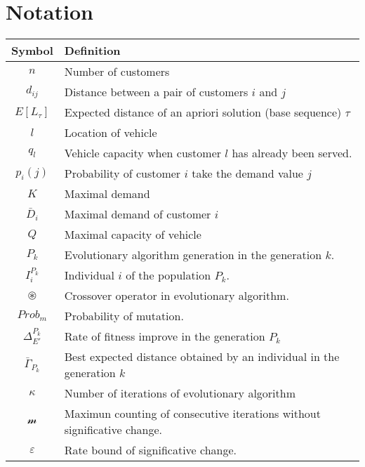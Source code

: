 \chapter*{Notation}
\label{chap:notation}

\begin{table}
 \begin{tabular}{|c|l|}
  \hline
  \textbf{Symbol} & \textbf{Definition}\\
  \hline
  $n$ & Number of customers\\
  $d_{ij}$ & Distance between a pair of customers $i$ and $j$\\
  $E[L_{\tau}]$ & Expected distance of an apriori solution (base sequence) $\tau$\\
  $l$ & Location of vehicle\\
  $q_l$ & Vehicle capacity when customer $l$ has already been served.\\
  $p_i(j)$ & Probability of customer $i$ take the demand value $j$\\
  $K$ & Maximal demand\\
  $\bar{D}_i$ & Maximal demand of customer $i$\\
  $Q$ & Maximal capacity of vehicle\\
  $P_k$ & Evolutionary algorithm generation in the generation $k$.\\
  $I^{P_k}_i$ & Individual $i$ of the population $P_k$.\\
  $\circledast$ & Crossover operator in evolutionary algorithm.\\
  $Prob_m$ & Probability of mutation.\\
  $\Delta^{P_k}_{E'}$ & Rate of fitness improve in the generation $P_k$\\
  $\bar{\Gamma}_{P_k}$ & Best expected distance obtained by an individual in the generation $k$\\
  $\kappa$ & Number of iterations of evolutionary algorithm\\
  $\mathcal{m}$ & Maximun counting of consecutive iterations without significative change.\\
  $\varepsilon$ & Rate bound of significative change.\\
  \hline
 \end{tabular}

\end{table}
